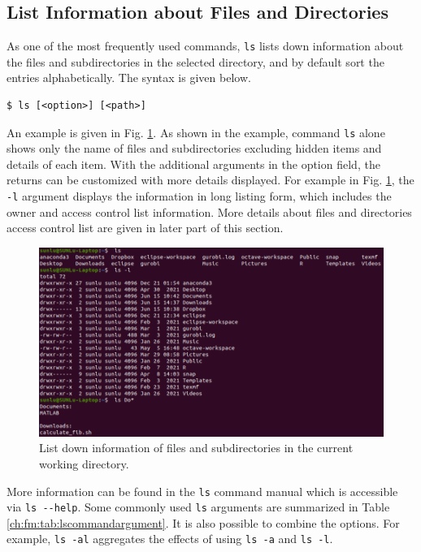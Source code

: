 \subsection{List Information about Files and Directories}

As one of the most frequently used commands, \verb|ls| lists down information about the files and subdirectories in the selected directory, and by default sort the entries alphabetically. The syntax is given below.
\begin{lstlisting}
$ ls [<option>] [<path>]
\end{lstlisting}

An example is given in Fig. \ref{ch:fm:fig:lscommandexample}. As shown in the example, command \verb|ls| alone shows only the name of files and subdirectories excluding hidden items and details of each item. With the additional arguments in the option field, the returns can be customized with more details displayed. For example in Fig. \ref{ch:fm:fig:lscommandexample}, the \verb|-l| argument displays the information in long listing form, which includes the owner and access control list information. More details about files and directories access control list are given in later part of this section.

\begin{figure}[!htb]
	\centering
	\includegraphics[width=350pt]{chapters/part-1/figures/ls_command_example.png}
	\caption{List down information of files and subdirectories in the current working directory.} \label{ch:fm:fig:lscommandexample}
\end{figure}

More information can be found in the \verb|ls| command manual which is accessible via \verb|ls --help|. Some commonly used \verb|ls| arguments are summarized in Table \ref{ch:fm:tab:lscommandargument}. It is also possible to combine the options. For example, \verb|ls -al| aggregates the effects of using \verb|ls -a| and \verb|ls -l|.

